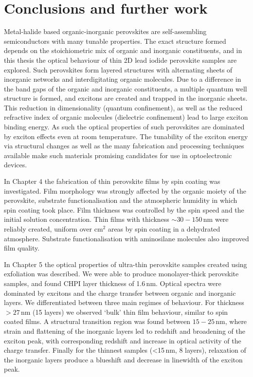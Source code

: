 
\chapter{Conclusions and further work}

\graphicspath{{Chapter8/Figures/}}

Metal-halide based organic-inorganic perovskites are self-assembling semiconductors with many tunable properties. The exact structure formed depends on the stoichiometric mix of organic and inorganic constituents, and in this thesis the optical behaviour of thin 2D lead iodide perovskite samples are explored. Such perovskites form layered structures with alternating sheets of inorganic  networks and interdigitating organic molecules. Due to a difference in the band gaps of the organic and inorganic constituents, a multiple quantum well structure is formed, and excitons are created and trapped in the inorganic sheets. This reduction in dimensionality (quantum confinement), as well as the reduced refractive index of organic molecules (dielectric confinement) lead to large exciton binding energy. As such the optical properties of such perovskites are dominated by exciton effects even at room temperature. The tunability of the exciton energy via structural changes as well as the many fabrication and processing techniques available make such materials promising candidates for use in optoelectronic devices.

In Chapter 4 the fabrication of thin perovskite films by spin coating was investigated. Film morphology was strongly affected by the organic moiety of the perovskite, substrate functionalisation and the atmospheric humidity in which spin coating took place. Film thickness was controlled by the spin speed and the initial solution concentration. Thin films with thickness $\sim30-150$\,nm were reliably created, uniform over cm$^2$ areas by spin coating in a dehydrated atmosphere. Substrate functionalisation with aminosilane molecules also improved film quality.

In Chapter 5 the optical properties of ultra-thin perovskite samples created using exfoliation was described. We were able to produce monolayer-thick perovskite samples, and found CHPI layer thickness of 1.6\,nm. Optical spectra were dominated by excitons and the charge transfer between organic and inorganic layers. We differentiated between three main regimes of behaviour. For thickness $>27$\,nm (15 layers) we observed `bulk' thin film behaviour, similar to spin coated films. A structural transition region was found between $15-25$\,nm, where strain and flattening of the inorganic layers led to redshift and broadening of the exciton peak, with corresponding redshift and increase in optical activity of the charge transfer. Finally for the thinnest samples (<15\,nm, 8 layers), relaxation of the inorganic layers produce a blueshift and decrease in linewidth of the exciton peak.

